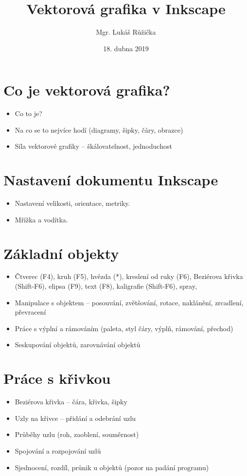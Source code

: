 \documentclass[12pt,a4paper]{article}
\title{Vektorová grafika v Inkscape}
\author{Mgr. Lukáš Růžička}
\date{18. dubna 2019}
\begin{document}
\maketitle

\section{Co je vektorová grafika?}
	\begin{itemize}
		\item Co to je?
	 	\item Na co se to nejvíce hodí (diagramy, šipky, čáry, obrazce)
	 	\item Síla vektorové grafiky -- škálovatelnost, jednoduchost
	\end{itemize}

\section{Nastavení dokumentu Inkscape}
\begin{itemize}
	\item Nastavení velikosti, orientace, metriky.
	\item Mřížka a vodítka.
\end{itemize}

\section{Základní objekty}
	\begin{itemize}
		\item Čtverec (F4), kruh (F5), hvězda (*), kreslení od ruky (F6), Beziérova křivka (Shift-F6), elipsa (F9), text (F8), kaligrafie (Shift-F6), spray, 
		\item Manipulace s objektem -- posouvání, zvětšování, rotace, naklánění, zrcadlení, převracení
		\item Práce s výplní a rámováním (paleta, styl čáry, výplň, rámování, přechod)
		\item Seskupování objektů, zarovnávání objektů
	\end{itemize}	

\section{Práce s křivkou}
 \begin{itemize}
		\item Beziérova křivka -- čára, křivka, šipky
		\item Uzly na křivce -- přidání a odebrání uzlu
		\item Průběhy uzlu (roh, zaoblení, souměrnost)
		\item Spojování a rozpojování uzlů
		\item Sjednocení, rozdíl, průnik u objektů (pozor na padání programu)
	\end{itemize}
	
\end{document}
